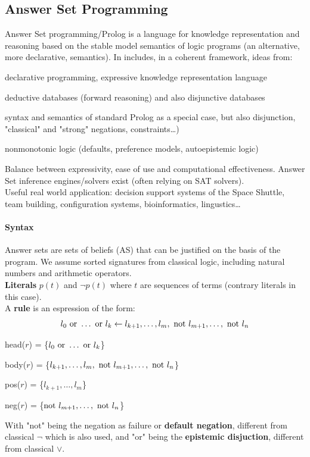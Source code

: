 \documentclass[10pt]{report}
\begin{document}
\subsection{Answer Set Programming}
Answer Set programming/Prolog is a language for knowledge representation and reasoning based on the stable model semantics of logic programs (an alternative, more declarative, semantics). In includes, in a coherent framework, ideas from:
\begin{list}{}{}
	\item declarative programming, expressive knowledge representation language
	\item deductive databases (forward reasoning) and also disjunctive databases
	\item syntax and semantics of standard Prolog as a special case, but also disjunction, "classical" and "strong" negations, constraints\ldots)
	\item nonmonotonic logic (defaults, preference models, autoepistemic logic)
\end{list}
Balance between expressivity, ease of use and computational effectiveness. Answer Set inference engines/solvers exist (often relying on SAT solvers).\\
Useful real world application: decision support systems of the Space Shuttle, team building, configuration systems, bioinformatics, lingustics\ldots
\paragraph{Syntax} Answer sets are sets of beliefs (AS) that can be justified on the basis of the program. We assume sorted signatures from classical logic, including natural numbers and arithmetic operators.\\
\textbf{Literals} $p(t)$ and $\neg p(t)$ where $t$ are sequences of terms (contrary literals in this case).\\
A \textbf{rule} is an espression of the form:
$$l_0\hbox{ or }\ldots\hbox{ or }l_k\leftarrow l_{k+1},\ldots,l_m,\hbox{ not }l_{m+1},\ldots,\hbox{ not }l_n$$
\begin{list}{}{}
	\item head($r$) = \{$l_0\hbox{ or }\ldots\hbox{ or }l_k$\}
	\item body($r$) = \{$l_{k+1},\ldots,l_m,\hbox{ not }l_{m+1},\ldots,\hbox{ not }l_n$\}
	\item pos($r$) = \{$l_{k+1},\ldots,l_m$\}
	\item neg($r$) = \{$\hbox{not }l_{m+1},\ldots,\hbox{ not }l_n$\}
\end{list}
With "not" being the negation as failure or \textbf{default negation}, different from classical $\neg$ which is also used, and "or" being the \textbf{epistemic disjuction}, different from classical $\vee$.
\end{document}

